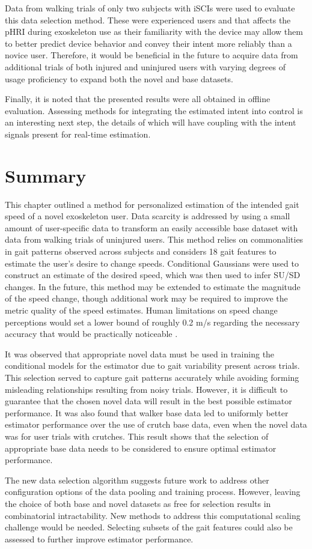 Data from walking trials of only two subjects with iSCIs were used to evaluate this data selection method. These were experienced users and that affects the pHRI during exoskeleton use as their familiarity with the device may allow them to better predict device behavior and convey their intent more reliably than a novice user. Therefore, it would be beneficial in the future to acquire data from additional trials of both injured and uninjured users with varying degrees of usage proficiency to expand both the novel and base datasets.

Finally, it is noted that the presented results were all obtained in offline evaluation. Assessing methods for integrating the estimated intent into control is an interesting next step, the details of which will have coupling with the intent signals present for real-time estimation. 

\section{Summary} \label{sec:conclusion}
%
This chapter outlined a method for personalized estimation of the intended gait speed of a novel exoskeleton user. Data scarcity is addressed by using a small amount of user-specific data to transform an easily accessible base dataset with data from walking trials of uninjured users. This method relies on commonalities in gait patterns observed across subjects and considers 18 gait features to estimate the user's desire to change speeds. Conditional Gaussians were used to construct an estimate of the desired speed, which was then used to infer SU/SD changes. In the future, this method may be extended to estimate the magnitude of the speed change, though additional work may be required to improve the metric quality of the speed estimates. Human limitations on speed change perceptions would set a lower bound of roughly 0.2 m/s regarding the necessary accuracy that would be practically noticeable \cite{zhang2015investigation}.

It was observed that appropriate novel data must be used in training the conditional models for the estimator due to gait variability present across trials. This selection served to capture gait patterns accurately while avoiding forming misleading relationships resulting from noisy trials. However, it is difficult to guarantee that the chosen novel data will result in the best possible estimator performance. It was also found that walker base data led to uniformly better estimator performance over the use of crutch base data, even when the novel data was for user trials with crutches. This result shows that the selection of appropriate base data needs to be considered to ensure optimal estimator performance. 

The new data selection algorithm suggests future work to address other configuration options of the data pooling and training process. However, leaving the choice of both base and novel datasets as free for selection results in  combinatorial intractability. New methods to address this computational scaling challenge would be needed. Selecting subsets of the gait features could also be assessed to further improve estimator performance.
